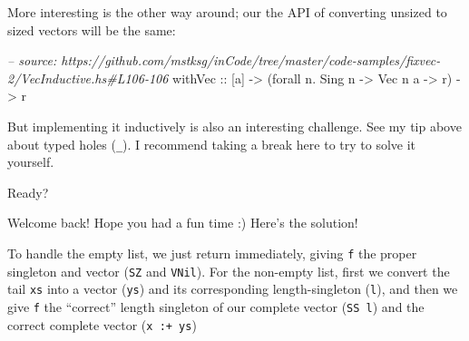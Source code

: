 \documentclass[]{article}
\newenvironment{Shaded}{}{}
\newcommand{\KeywordTok}[1]{\textcolor[rgb]{0.00,0.44,0.13}{\textbf{#1}}}
\newcommand{\DataTypeTok}[1]{\textcolor[rgb]{0.56,0.13,0.00}{#1}}
\newcommand{\CommentTok}[1]{\textcolor[rgb]{0.38,0.63,0.69}{\textit{#1}}}
\newcommand{\OtherTok}[1]{\textcolor[rgb]{0.00,0.44,0.13}{#1}}
\newcommand{\FunctionTok}[1]{\textcolor[rgb]{0.02,0.16,0.49}{#1}}
\newcommand{\NormalTok}[1]{#1}
\begin{document}
More interesting is the other way around; our the API of converting unsized to
sized vectors will be the same:

\begin{Shaded}
\begin{Highlighting}[]
\CommentTok{-- source: https://github.com/mstksg/inCode/tree/master/code-samples/fixvec-2/VecInductive.hs#L106-106}
\OtherTok{withVec ::}\NormalTok{ [a] }\OtherTok{->}\NormalTok{ (forall n}\FunctionTok{.} \DataTypeTok{Sing}\NormalTok{ n }\OtherTok{->} \DataTypeTok{Vec}\NormalTok{ n a }\OtherTok{->}\NormalTok{ r) }\OtherTok{->}\NormalTok{ r}
\end{Highlighting}
\end{Shaded}

But implementing it inductively is also an interesting challenge. See my tip
above about typed holes (\texttt{\_}). I recommend taking a break here to try to
solve it yourself.

Ready?

Welcome back! Hope you had a fun time :) Here's the solution!

\begin{Shaded}
\end{Shaded}

To handle the empty list, we just return immediately, giving \texttt{f} the
proper singleton and vector (\texttt{SZ} and \texttt{VNil}). For the non-empty
list, first we convert the tail \texttt{xs} into a vector (\texttt{ys}) and its
corresponding length-singleton (\texttt{l}), and then we give \texttt{f} the
``correct'' length singleton of our complete vector (\texttt{SS\ l}) and the
correct complete vector (\texttt{x\ :+\ ys})
\end{document}
